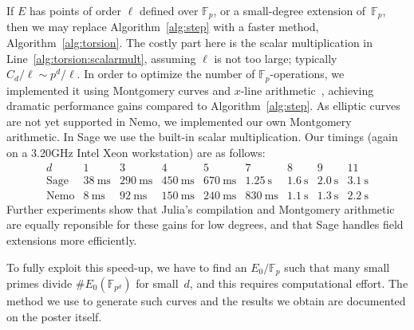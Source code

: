 \documentclass[12pt]{article}
\newcommand{\F}{\mathbb{F}}
\newcommand{\FF}{\F}
\newcommand{\ms}{\mathrm{\ ms}}
\newcommand{\s}{\mathrm{\ s}}
\begin{document}
If $E$ has points of order $\ell$
defined over \(\FF_p\), or a small-degree extension of~\(\FF_p\),
then we may replace Algorithm~\ref{alg:step}
with a faster method, Algorithm~\ref{alg:torsion}.
The costly part here is the scalar multiplication in
Line~\ref{alg:torsion:scalarmult}, assuming $\ell$ is not too large;
typically \(C_d/\ell\sim p^d/\ell\).
In order to optimize the number of $\F_p$-operations, we implemented it
using Montgomery curves and \(x\)-line arithmetic~\cite{Montgomery}, 
achieving dramatic performance gains compared to
Algorithm~\ref{alg:step}.
As elliptic curves are not yet supported in Nemo, we implemented our own Montgomery arithmetic. In Sage we use the built-in scalar multiplication. 
Our timings (again on a 3.20GHz Intel Xeon workstation) are as follows:
\[
    \begin{array}{c|c|c|c|c|c|c|c|c}
        d & 1 & 3 & 4 & 5 & 7 & 8 & 9 & 11\\
        \hline
        \text{Sage} & 38 \ms & 290 \ms & 450 \ms & 670 \ms & 1.25 \s & 1.6 \s & 2.0 \s & 3.1  \s \\
        \hline
        \text{Nemo} & 8 \ms & 92 \ms & 150 \ms & 240 \ms & 830 \ms & 1.1 \s & 1.3 \s & 2.2 \s 
    \end{array}
\]
Further experiments show that Julia's compilation and Montgomery arithmetic are equally reponsible for these gains for low degrees, and that Sage handles field extensions more efficiently.

To fully exploit this speed-up, we have to find an \(E_0/\F_p\)
such that many small primes divide \(\#E_0(\FF_{p^d})\) for small~\(d\), and this requires computational effort. The method we use to generate such curves and the results we obtain are documented on the poster itself.
\end{document}
